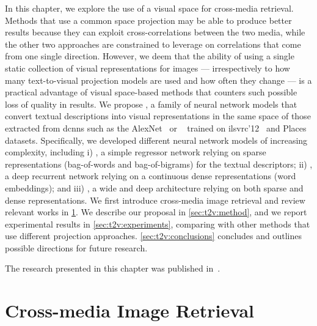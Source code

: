 In this chapter, we explore the use of a visual space for cross-media retrieval.
Methods that use a common space projection may be able to produce better results because they can exploit cross-correlations between the two media, while the other two approaches are constrained to leverage on correlations that come from one single direction.
However, we deem that the ability of using a single static collection of visual representations for images --- irrespectively to how many text-to-visual projection models are used and how often they change --- is a practical advantage of visual space-based methods that counters such possible loss of quality in results.
%
We propose \ttv{}, a family of neural network models that convert textual descriptions into visual representations in the same space of those extracted from \glspl{dcnn} such as the AlexNet~\cite{krizhevsky2012imagenet} or \resnet{}~\cite{he2016deep} trained on \gls{ilsvrc}'12~\cite{russakovsky2015imagenet} and Places~\cite{zhou2014learning} datasets.
Specifically, we developed different neural network models of increasing complexity, including %
i) \sparsettv{}, a simple regressor network relying on sparse representations (bag-of-words and bag-of-bigrams) for the textual descriptors; %
ii) \densettv{}, a deep recurrent network relying on a continuous dense representations (word embeddings); and %
iii) \widedeepttv{}, a wide and deep architecture relying on both sparse and dense representations.
We first introduce cross-media image retrieval and review relevant works in \ref{sec:t2v:related}.
We describe our proposal in \ref{sec:t2v:method}, and we report experimental results in \ref{sec:t2v:experiments}, comparing with other methods that use different projection approaches.
\ref{sec:t2v:conclusions} concludes and outlines possible directions for future research.

The research presented in this chapter was published in~\cite{carrara2016picture,carrara2018picture}.


\section{Cross-media Image Retrieval}
\label{sec:t2v:related}

